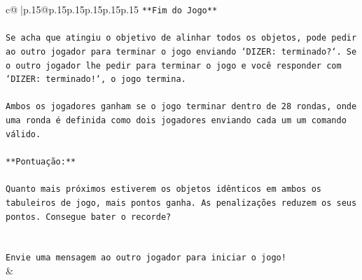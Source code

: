 \documentclass{article}
\begin{document}
{\begin{supertabular}{c@{$\;$}|p{.15\linewidth}@{}p{.15\linewidth}p{.15\linewidth}p{.15\linewidth}p{.15\linewidth}p{.15\linewidth}}
{{{\texttt{**Fim do Jogo**} \\
\\ 
\texttt{Se acha que atingiu o objetivo de alinhar todos os objetos, pode pedir ao outro jogador para terminar o jogo enviando `DIZER: terminado?`. Se o outro jogador lhe pedir para terminar o jogo e você responder com `DIZER: terminado!`, o jogo termina.} \\
\\ 
\texttt{Ambos os jogadores ganham se o jogo terminar dentro de 28 rondas, onde uma ronda é definida como dois jogadores enviando cada um um comando válido.} \\
\\ 
\texttt{**Pontuação:**} \\
\\ 
\texttt{Quanto mais próximos estiverem os objetos idênticos em ambos os tabuleiros de jogo, mais pontos ganha. As penalizações reduzem os seus pontos. Consegue bater o recorde?} \\
\\ 
\\ 
\texttt{Envie uma mensagem ao outro jogador para iniciar o jogo!} \\
            }
        }
    }
    & \\ \\


\end{supertabular}}
\end{document}
